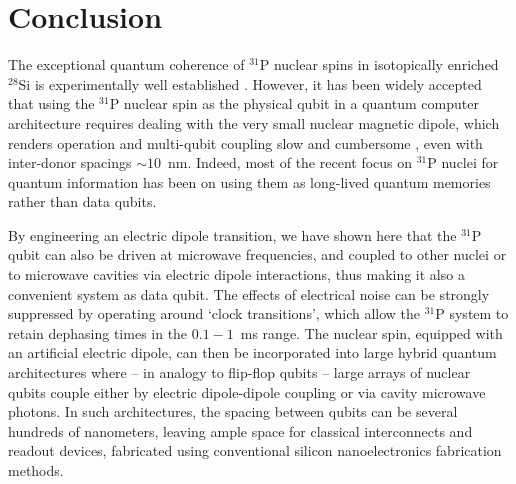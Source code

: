 \section{Conclusion} \label{sec:conclusion}

The exceptional quantum coherence of $^{31}$P nuclear spins in isotopically enriched $^{28}$Si is experimentally well established \cite{Saeedi2013,Muhonen2014}. However, it has been widely accepted that using the $^{31}$P nuclear spin as the physical qubit in a quantum computer architecture requires dealing with the very small nuclear magnetic dipole, which renders operation and multi-qubit coupling slow and cumbersome \cite{Kane1998,Ogorman2016,Hill2015}, even with inter-donor spacings $\sim 10$~nm. Indeed, most of the recent focus on $^{31}$P nuclei for quantum information has been on using them as long-lived quantum memories \cite{Morton2008,Freer2017} rather than data qubits. 

By engineering an electric dipole transition, we have shown here that the $^{31}$P qubit can also be driven at microwave frequencies, and coupled to other nuclei or to microwave cavities via electric dipole interactions, thus making it also a convenient system as data qubit. The effects of electrical noise can be strongly suppressed by operating around `clock transitions', which allow the $^{31}$P system to retain dephasing times in the $0.1 - 1$~ms range. The nuclear spin, equipped with an artificial electric dipole, can then be incorporated into large hybrid quantum architectures \cite{Xiang2013} where -- in analogy to flip-flop qubits \cite{Tosi2017} -- large arrays of nuclear qubits couple either by electric dipole-dipole coupling or via cavity microwave photons. In such architectures, the spacing between qubits can be several hundreds of nanometers, leaving ample space for classical interconnects \cite{Fischer2015,Franke2018} and readout devices, fabricated using conventional silicon nanoelectronics fabrication methods.